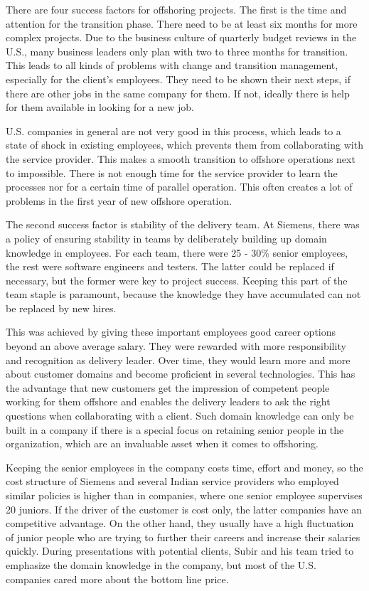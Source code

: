 There are four success factors for offshoring projects. The first is the time and attention for the transition phase. There need to be at least six months for more complex projects. Due to the business culture of quarterly budget reviews in the U.S., many business leaders only plan with two to three months for transition. This leads to all kinds of problems with change and transition management, especially for the client's employees. They need to be shown their next steps, if there are other jobs in the same company for them. If not, ideally there is help for them available in looking for a new job.

U.S. companies in general are not very good in this process, which leads to a state of shock in existing employees, which prevents them from collaborating with the service provider. This makes a smooth transition to offshore operations next to impossible. There is not enough time for the service provider to learn the processes nor for a certain time of parallel operation. This often creates a lot of problems in the first year of new offshore operation.

The second success factor is stability of the delivery team. At Siemens, there was a policy of ensuring stability in teams by deliberately building up domain knowledge in employees. For each team, there were 25 - 30\% senior employees, the rest were software engineers and testers. The latter could be replaced if necessary, but the former were key to project success. Keeping this part of the team staple is paramount, because the knowledge they have accumulated can not be replaced by new hires. 

This was achieved by giving these important employees good career options beyond an above average salary. They were rewarded with more responsibility and recognition as delivery leader. Over time, they would learn more and more about customer domains and become proficient in several technologies. This has the advantage that new customers get the impression of competent people working for them offshore and enables the delivery leaders to ask the right questions when collaborating with a client. Such domain knowledge can only be built in a company if there is a special focus on retaining senior people in the organization, which are an invaluable asset when it comes to offshoring.

Keeping the senior employees in the company costs time, effort and money, so the cost structure of Siemens and several Indian service providers who employed similar policies is higher than in companies, where one senior employee supervises 20 juniors. If the driver of the customer is cost only, the latter companies have an competitive advantage. On the other hand, they usually have a high fluctuation of junior people who are trying to further their careers and increase their salaries quickly. During presentations with potential clients, Subir and his team tried to emphasize the domain knowledge in the company, but most of the U.S. companies cared more about the bottom line price.


